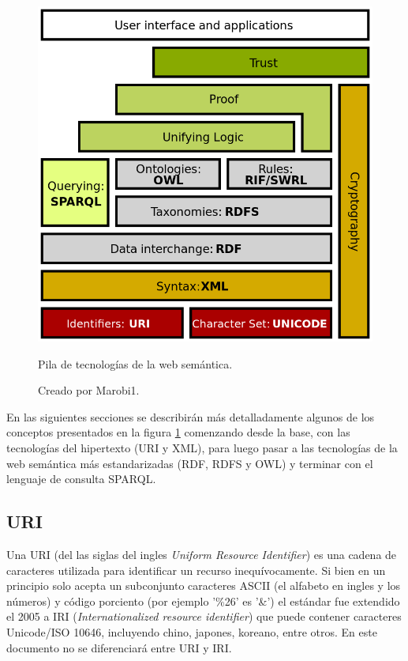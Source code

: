 \begin{figure}[htpb]
  \centering
  \includegraphics[width=.6\textwidth]{figures/Semantic_web_stack.png}
  \caption{Pila de tecnologías de la web semántica.}
  \vspace{-.25cm}
  \caption*{Creado por Marobi1\cite{wikimg:swstack}.}
  \label{fig:swstack}
\end{figure}

En las siguientes secciones se describirán más detalladamente algunos de los
conceptos presentados en la figura \ref{fig:swstack} comenzando desde la base,
con las tecnologías del hipertexto (URI y XML), para luego pasar a las
tecnologías de la web semántica más estandarizadas (RDF, RDFS y OWL) y terminar
con el lenguaje de consulta SPARQL.

\subsection{URI}
Una URI (del las siglas del ingles \emph{Uniform Resource Identifier}) es una
cadena de caracteres utilizada para identificar un recurso inequívocamente.
Si bien en un principio solo acepta un subconjunto caracteres ASCII (el alfabeto
en ingles y los números) y código porciento (por ejemplo '\%26' es '\&') el
estándar fue extendido el 2005 a IRI (\emph{Internationalized resource
identifier}) que puede contener caracteres Unicode/ISO 10646, incluyendo chino,
japones, koreano, entre otros\cite{gangemi2006bourne}. En este documento no se
diferenciará entre URI y IRI.

